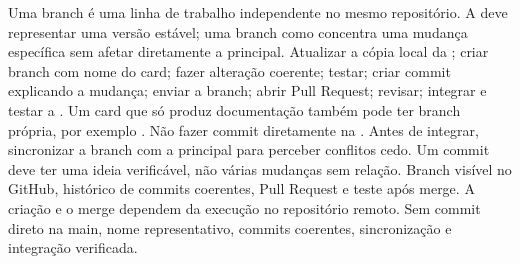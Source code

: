 
 Uma branch é uma linha de trabalho independente no mesmo repositório. A  deve representar uma versão estável; uma branch como  concentra uma mudança específica sem afetar diretamente a principal.
 Atualizar a cópia local da ; criar branch com nome do card; fazer alteração coerente; testar; criar commit explicando a mudança; enviar a branch; abrir Pull Request; revisar; integrar e testar a . Um card que só produz documentação também pode ter branch própria, por exemplo .
 Não fazer commit diretamente na . Antes de integrar, sincronizar a branch com a principal para perceber conflitos cedo. Um commit deve ter uma ideia verificável, não várias mudanças sem relação.
 Branch visível no GitHub, histórico de commits coerentes, Pull Request e teste após merge. A criação e o merge dependem da execução no repositório remoto.
 Sem commit direto na main, nome representativo, commits coerentes, sincronização e integração verificada.

